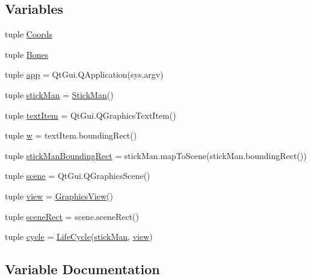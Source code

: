 \subsection*{Variables}
\begin{DoxyCompactItemize}
\item 
tuple \hyperlink{namespacestickman_a91345d1dd0e2be6b1befb5e313110484}{Coords}
\item 
tuple \hyperlink{namespacestickman_ac04f7c67fc601ea018a0d7a134680432}{Bones}
\item 
tuple \hyperlink{namespacestickman_a7a6768c8c5fa928570f79e25a6f23498}{app} = Qt\+Gui.\+Q\+Application(sys.\+argv)
\item 
tuple \hyperlink{namespacestickman_aa61853c5c059feeabc36dee3af2732fb}{stick\+Man} = \hyperlink{classstickman_1_1StickMan}{Stick\+Man}()
\item 
tuple \hyperlink{namespacestickman_a7ff8a6268683719b836aa5fe64be9a12}{text\+Item} = Qt\+Gui.\+Q\+Graphics\+Text\+Item()
\item 
tuple \hyperlink{namespacestickman_a1061806814c37e16835abeaab049a871}{w} = text\+Item.\+bounding\+Rect()
\item 
tuple \hyperlink{namespacestickman_aae11c6b85a7efe27b0ef9db3ebbd07de}{stick\+Man\+Bounding\+Rect} = stick\+Man.\+map\+To\+Scene(stick\+Man.\+bounding\+Rect())
\item 
tuple \hyperlink{namespacestickman_ac4826e705d36794cd0b5e270df055801}{scene} = Qt\+Gui.\+Q\+Graphics\+Scene()
\item 
tuple \hyperlink{namespacestickman_a9b7b294b6b24ca2dca6ecceee16e3d9b}{view} = \hyperlink{classstickman_1_1GraphicsView}{Graphics\+View}()
\item 
tuple \hyperlink{namespacestickman_a2cb447118bb11d15c1b1316e6cbc0b18}{scene\+Rect} = scene.\+scene\+Rect()
\item 
tuple \hyperlink{namespacestickman_a5715a748a28470f614e05a26d1c7bc4c}{cycle} = \hyperlink{classstickman_1_1LifeCycle}{Life\+Cycle}(\hyperlink{namespacestickman_aa61853c5c059feeabc36dee3af2732fb}{stick\+Man}, \hyperlink{namespacestickman_a9b7b294b6b24ca2dca6ecceee16e3d9b}{view})
\end{DoxyCompactItemize}


\subsection{Variable Documentation}
\hypertarget{namespacestickman_a7a6768c8c5fa928570f79e25a6f23498}{}
